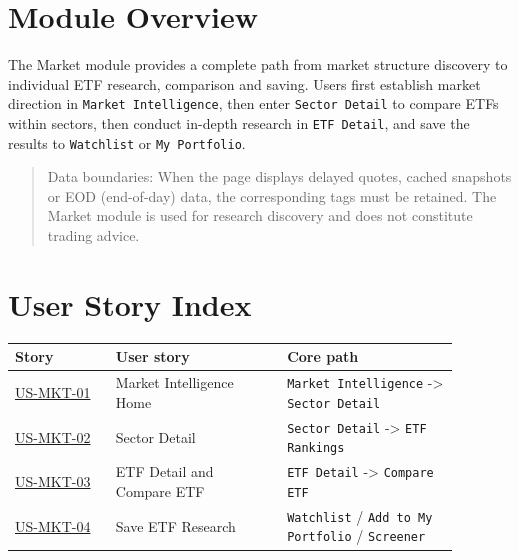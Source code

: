 \section{Module Overview}
The Market module provides a complete path from market structure discovery to individual ETF research, comparison and saving. Users first establish market direction in \texttt{Market Intelligence}, then enter \texttt{Sector Detail} to compare ETFs within sectors, then conduct in-depth research in \texttt{ETF Detail}, and save the results to \texttt{Watchlist} or \texttt{My Portfolio}.
\begin{quote}\small Data boundaries: When the page displays delayed quotes, cached snapshots or EOD (end-of-day) data, the corresponding tags must be retained. The Market module is used for research discovery and does not constitute trading advice.\end{quote}
\section{User Story Index}
\begingroup
\small
\begin{longtable}{L{0.20\linewidth}L{0.34\linewidth}L{0.34\linewidth}}
\toprule
\textbf{Story} & \textbf{User story} & \textbf{Core path} \\
\midrule
\hyperlink{us-mkt-01}{US-MKT-01} & Market Intelligence Home & \texttt{Market Intelligence} -\textgreater{} \texttt{Sector Detail} \\
\hyperlink{us-mkt-02}{US-MKT-02} & Sector Detail & \texttt{Sector Detail} -\textgreater{} \texttt{ETF Rankings} \\
\hyperlink{us-mkt-03}{US-MKT-03} & ETF Detail and Compare ETF & \texttt{ETF Detail} -\textgreater{} \texttt{Compare ETF} \\
\hyperlink{us-mkt-04}{US-MKT-04} & Save ETF Research & \texttt{Watchlist} /\allowbreak{} \texttt{Add to My Portfolio} /\allowbreak{} \texttt{Screener} \\
\bottomrule
\end{longtable}
\endgroup

